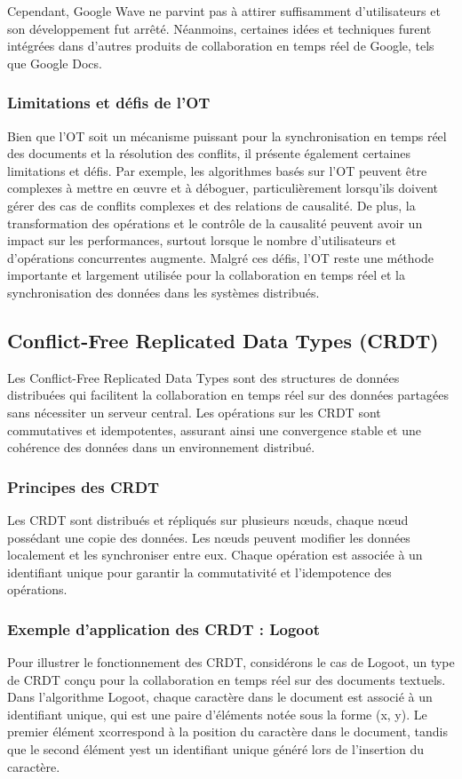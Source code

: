 Cependant, Google Wave ne parvint pas à attirer suffisamment d'utilisateurs et son développement fut arrêté. Néanmoins, certaines idées et techniques furent intégrées dans d'autres produits de collaboration en temps réel de Google, tels que Google Docs.

\subsubsection{Limitations et défis de l'OT}
Bien que l'OT soit un mécanisme puissant pour la synchronisation en temps réel des documents et la résolution des conflits, il présente également certaines limitations et défis. Par exemple, les algorithmes basés sur l'OT peuvent être complexes à mettre en \oe{}uvre et à déboguer, particulièrement lorsqu'ils doivent gérer des cas de conflits complexes et des relations de causalité. De plus, la transformation des opérations et le contrôle de la causalité peuvent avoir un impact sur les performances, surtout lorsque le nombre d'utilisateurs et d'opérations concurrentes augmente. Malgré ces défis, l'OT reste une méthode importante et largement utilisée pour la collaboration en temps réel et la synchronisation des données dans les systèmes distribués.

\subsection{Conflict-Free Replicated Data Types (CRDT)}
Les Conflict-Free Replicated Data Types sont des structures de données distribuées qui facilitent la collaboration en temps réel sur des données partagées sans nécessiter un serveur central. Les opérations sur les \gls{CRDT} sont commutatives et idempotentes, assurant ainsi une convergence stable et une cohérence des données dans un environnement distribué.

\subsubsection{Principes des \gls{CRDT}}
Les \gls{CRDT} sont distribués et répliqués sur plusieurs n\oe{}uds, chaque n\oe{}ud possédant une copie des données. Les n\oe{}uds peuvent modifier les données localement et les synchroniser entre eux. Chaque opération est associée à un identifiant unique pour garantir la commutativité et l'idempotence des opérations.

\subsubsection{Exemple d'application des \gls{CRDT} : Logoot}
Pour illustrer le fonctionnement des \gls{CRDT}, considérons le cas de Logoot, un type de \gls{CRDT} conçu pour la collaboration en temps réel sur des documents textuels. Dans l'algorithme Logoot, chaque caractère dans le document est associé à un identifiant unique, qui est une paire d'éléments notée sous la forme \guillemotleft (x, y)\guillemotright. Le premier élément \guillemotleft x\guillemotright correspond à la position du caractère dans le document,  tandis que le second élément \guillemotleft y\guillemotright est un identifiant unique généré lors de l'insertion du caractère.

